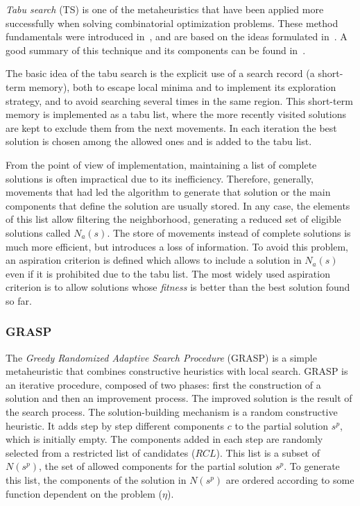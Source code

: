\emph{Tabu search} (TS) is one of the metaheuristics that have been applied more successfully when solving combinatorial optimization problems. These method fundamentals were introduced in~\cite{glover86future}, and are based on the ideas formulated in~\cite{glover77heuristics}. A good summary of this technique and its components can be found in~\cite{glover77heuristics}.

The basic idea of the tabu search is the explicit use of a search record (a short-term memory), both to escape local minima and to implement its exploration strategy, and to avoid searching several times in the same region. This short-term memory is implemented as a tabu list, where the more recently visited solutions are kept to exclude them from the next movements. In each iteration the best solution is chosen among the allowed ones and is added to the tabu list.

From the point of view of implementation, maintaining a list of complete solutions is often impractical due to its inefficiency. Therefore, generally, movements that had led the algorithm to generate that solution or the main components that define the solution are usually stored. In any case, the elements of this list allow filtering the neighborhood, generating a reduced set of eligible solutions called $N_a(s)$. The store of movements instead of complete solutions is much more efficient, but introduces a loss of information. To avoid this problem, an aspiration criterion is defined which allows to include a solution in $N_a(s)$ even if it is prohibited due to the tabu list. The most widely used aspiration criterion is to allow solutions whose \emph{fitness} is better than the best solution found so far.

\subsubsection{GRASP}

The \emph{Greedy Randomized Adaptive Search Procedure} (GRASP) \cite{feo95greedy} is a simple metaheuristic that combines constructive heuristics with local search. GRASP is an iterative procedure, composed of two phases: first the construction of a solution and then an improvement process. The improved solution is the result of the search process. The solution-building mechanism is a random constructive heuristic. It adds step by step different components $c$ to the partial solution $s^p$, which is initially empty. The components added in each step are randomly selected from a restricted list of candidates ($RCL$). This list is a subset of $N(s^p)$, the set of allowed components for the partial solution $s^p$. To generate this list, the components of the solution in $N(s^p)$ are ordered according to some function dependent on the problem ($\eta$).

